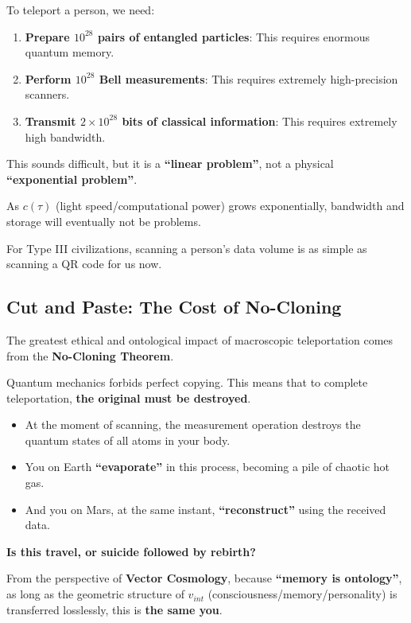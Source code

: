 To teleport a person, we need:

\begin{enumerate}
\item \textbf{Prepare $10^{28}$ pairs of entangled particles}: This requires enormous quantum memory.

\item \textbf{Perform $10^{28}$ Bell measurements}: This requires extremely high-precision scanners.

\item \textbf{Transmit $2 \times 10^{28}$ bits of classical information}: This requires extremely high bandwidth.
\end{enumerate}

This sounds difficult, but it is a \textbf{``linear problem''}, not a physical \textbf{``exponential problem''}.

As $c(\tau)$ (light speed/computational power) grows exponentially, bandwidth and storage will eventually not be problems.

For Type III civilizations, scanning a person's data volume is as simple as scanning a QR code for us now.

\subsection{Cut and Paste: The Cost of No-Cloning}

The greatest ethical and ontological impact of macroscopic teleportation comes from the \textbf{No-Cloning Theorem}.

Quantum mechanics forbids perfect copying. This means that to complete teleportation, \textbf{the original must be destroyed}.

\begin{itemize}
\item At the moment of scanning, the measurement operation destroys the quantum states of all atoms in your body.

\item You on Earth \textbf{``evaporate''} in this process, becoming a pile of chaotic hot gas.

\item And you on Mars, at the same instant, \textbf{``reconstruct''} using the received data.
\end{itemize}

\textbf{Is this travel, or suicide followed by rebirth?}

From the perspective of \textbf{Vector Cosmology}, because \textbf{``memory is ontology''}, as long as the geometric structure of $v_{int}$ (consciousness/memory/personality) is transferred losslessly, this is \textbf{the same you}.

